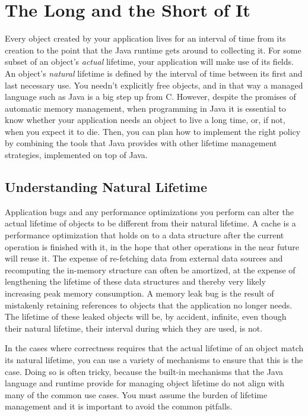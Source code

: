 \chapter{The Long and the Short of It}

Every object created by your application lives for an interval of time from its creation to the point
that the Java runtime gets around to collecting it. For some subset of an object's {\em actual} lifetime,
your application will make use of its fields.
An object's {\em natural} lifetime is defined by the interval of time between its first and last necessary use.
You needn't explicitly free objects, and in that way a managed language such as Java is a big step up from C.
However, despite the promises of automatic memory management, when programming in Java it is essential 
to know whether your application needs an object to live a long time, or,
if not, when you expect it to die. 
Then, you can plan how to implement the right policy by combining
the tools that Java provides with other lifetime management strategies, implemented on top of Java.   
  
\section{Understanding Natural Lifetime}

Application bugs and any performance optimizations you perform 
can alter the actual lifetime of objects to be different
from their natural lifetime.
A cache is a performance optimization that holds on to a data structure after the current operation is finished
with it, in the hope that
other operations
in the near future will reuse it. The expense of re-fetching data from external data sources and recomputing the in-memory
structure can often be amortized, at the expense of lengthening the lifetime of these data structures and thereby
very likely increasing peak memory consumption.
A memory leak bug is the result of mistakenly retaining references to objects that the application no longer
needs. The lifetime of these leaked objects will be, by accident, infinite, even though their natural lifetime, their
interval during which they are used, is not. 

In the cases where correctness requires that the actual lifetime of an object match its natural lifetime,
you can use a variety of mechanisms to ensure that this is the case. Doing so is often tricky, because the built-in mechanisms that the Java language
and runtime
provide for managing object lifetime do not align with many of the common use cases. You must assume the burden of
lifetime management and it is important to avoid
the common pitfalls.

